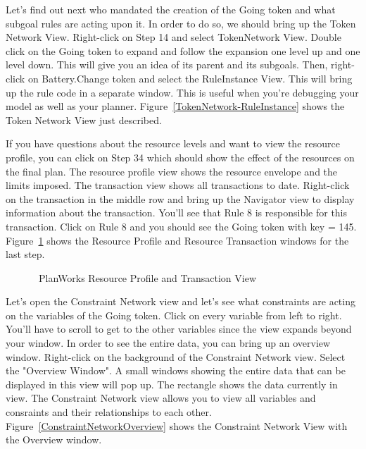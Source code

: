 \documentclass[10pt, letterpaper, twoside]{article}
\begin{document}
Let's find out next who mandated the creation of the Going token and what
subgoal rules are acting upon it.  In order to do so, we should bring up
the Token Network View.  Right-click on Step 14 and select TokenNetwork
View. Double click on the Going token to expand and follow the expansion
one level up and one level down.  This will give you an idea of its parent
and its subgoals.  Then, right-click on Battery.Change token and select the
RuleInstance View.  This will bring up the rule code in a separate window.
This is useful when you're debugging your model as well as your planner.
Figure~\ref{TokenNetwork-RuleInstance} shows the Token Network View
just described.


If you have questions about the resource levels and want to view the
resource profile, you can click on Step 34 which should show the effect of
the resources on the final plan. The resource profile view shows the
resource envelope and the limits imposed. The transaction view shows all
transactions to date.  Right-click on the transaction in the middle row and
bring up the Navigator view to display information about the transaction.
You'll see that Rule 8 is responsible for this transaction.  Click on Rule
8 and you should see the Going token with key = 145.
Figure~\ref{ResourceOverview} shows the Resource Profile and Resource
Transaction windows for the last step.

\begin{figure}[h]
\centering{}
\caption{\ET\, PlanWorks Resource Profile and Transaction View}
\label{ResourceOverview}
\end{figure}

Let's open the Constraint Network view and let's see what constraints are
acting on the variables of the Going token. Click on every variable from
left to right.  You'll have to scroll to get to the other variables since
the view expands beyond your window.  In order to see the entire data, you
can bring up an overview window.  Right-click on the background of the
Constraint Network view.  Select the "Overview Window".  A small windows
showing the entire data that can be displayed in this view will pop up.
The rectangle shows the data currently in view.  The Constraint Network
view allows you to view all variables and consraints and their
relationships to each other.  Figure~\ref{ConstraintNetworkOverview} shows
the Constraint Network View with the Overview window.
\end{document}
